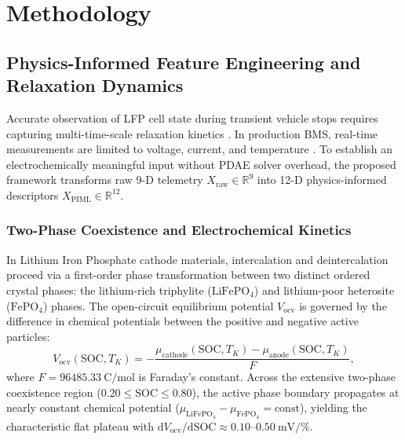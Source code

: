 \section{Methodology}
\label{sec:methodology}

\subsection{Physics-Informed Feature Engineering and Relaxation Dynamics}
\label{sec:meth_a}

Accurate observation of LFP cell state during transient vehicle stops requires capturing multi-time-scale relaxation kinetics \cite{sorouri2025breaking, xiong2018towards}. In production BMS, real-time measurements are limited to voltage, current, and temperature \cite{waag2014critical, lin2020mcunet}. To establish an electrochemically meaningful input without PDAE solver overhead, the proposed framework transforms raw 9-D telemetry $X_{\text{raw}} \in \mathbb{R}^9$ into 12-D physics-informed descriptors $X_{\text{PIML}} \in \mathbb{R}^{12}$.

\subsubsection{Two-Phase Coexistence and Electrochemical Kinetics}
In Lithium Iron Phosphate cathode materials, intercalation and deintercalation proceed via a first-order phase transformation between two distinct ordered crystal phases: the lithium-rich triphylite ($\text{LiFePO}_4$) and lithium-poor heterosite ($\text{FePO}_4$) phases. The open-circuit equilibrium potential $V_{\text{ocv}}$ is governed by the difference in chemical potentials between the positive and negative active particles:
\begin{equation}
	\label{eq:chemical_potential}
	V_{\text{ocv}}(\text{SOC}, T_K) = -\frac{\mu_{\text{cathode}}(\text{SOC}, T_K) - \mu_{\text{anode}}(\text{SOC}, T_K)}{F},
\end{equation}
where $F = 96485.33\ \text{C/mol}$ is Faraday's constant. Across the extensive two-phase coexistence region ($0.20 \le \text{SOC} \le 0.80$), the active phase boundary propagates at nearly constant chemical potential ($\mu_{\text{LiFePO}_4} - \mu_{\text{FePO}_4} = \text{const}$), yielding the characteristic flat plateau with $\text{d}V_{\text{ocv}}/\text{d}\text{SOC} \approx 0.10\text{--}0.50\ \text{mV/\%}$.


